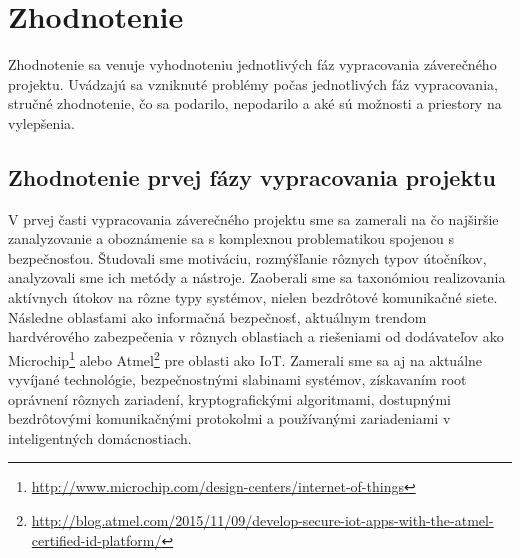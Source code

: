 \documentclass[12pt,a4paper,oneside,openright]{report}
\begin{document}
\chapter{Zhodnotenie} \label{s_conclusion}

Zhodnotenie sa venuje vyhodnoteniu jednotlivých fáz vypracovania záverečného projektu. Uvádzajú sa vzniknuté problémy počas jednotlivých fáz vypracovania, stručné zhodnotenie, čo sa podarilo, nepodarilo a aké sú možnosti a priestory na vylepšenia.

\section{Zhodnotenie prvej fázy vypracovania projektu}
V prvej časti vypracovania záverečného projektu sme sa zamerali na čo najširšie zanalyzovanie a oboznámenie sa s komplexnou problematikou spojenou s bezpečnosťou. Študovali sme motiváciu, rozmýšľanie rôznych typov útočníkov, analyzovali sme ich metódy a nástroje. Zaoberali sme sa taxonómiou realizovania aktívnych útokov na rôzne typy systémov, nielen bezdrôtové komunikačné siete. Následne oblasťami ako informačná bezpečnosť, aktuálnym trendom hardvérového zabezpečenia v rôznych oblastiach a riešeniami od dodávateľov ako Microchip\footnote{\url{http://www.microchip.com/design-centers/internet-of-things}} alebo Atmel\footnote{\url{http://blog.atmel.com/2015/11/09/develop-secure-iot-apps-with-the-atmel-certified-id-platform/}} pre oblasti ako IoT. Zamerali sme sa aj na aktuálne vyvíjané technológie, bezpečnostnými slabinami systémov, získavaním root oprávnení rôznych zariadení, kryptografickými algoritmami, dostupnými bezdrôtovými komunikačnými protokolmi a používanými zariadeniami v inteligentných domácnostiach.

\end{document}
